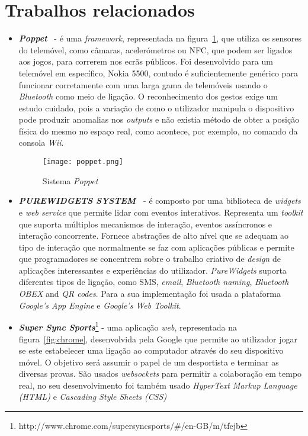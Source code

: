 \section{Trabalhos relacionados}
\begin{itemize}
\item \textbf{\textit{Poppet}}~\cite{Vajk2008b} - é uma \textit{framework}, representada na figura~\ref{fig:poppet}, que utiliza os sensores do telemóvel, como câmaras, acelerómetros ou NFC, que podem ser ligados aos jogos, para correrem nos ecrãs públicos. Foi desenvolvido para um telemóvel em específico, Nokia 5500, contudo é suficientemente genérico para funcionar corretamente com uma larga gama de telemóveis usando o \textit{Bluetooth} como meio de ligação. O reconhecimento dos gestos exige um estudo cuidado, pois a variação de como o utilizador manipula o dispositivo pode produzir anomalias nos \textit{outputs} e não existia método de obter a posição física do mesmo no espaço real, como acontece, por exemplo, no comando da consola \textit{Wii}.

\begin{figure}[ht]
\centering
\texttt{[image: poppet.png]}
\caption[Sistema \textit{Poppet}] {Sistema \textit{Poppet}~\cite{Vajk2008b}}
\label{fig:poppet}
\end{figure}

\item \textbf{\textit{PUREWIDGETS SYSTEM~\cite{Cardoso2012g}}} - é composto por uma biblioteca de \textit{widgets} e \textit{web service} que permite lidar com eventos interativos. Representa um \textit{toolkit} que suporta múltiplos mecanismos de interação, eventos assíncronos e interação concorrente. Fornece abstrações de alto nível que se adequam ao tipo de interação que normalmente se faz com aplicações públicas e permite que programadores se concentrem sobre o trabalho criativo de \textit{design} de aplicações interessantes e experiências do utilizador. \textit{PureWidgets} suporta diferentes tipos de ligação, como SMS, \textit{email}, \textit{Bluetooth naming}, \textit{Bluetooth OBEX} and \textit{QR codes}. Para a sua implementação foi usada a plataforma \textit{Google’s App Engine} e \textit{Google’s Web Toolkit}.


\item \textbf{\textit{Super Sync Sports}}\footnote{http://www.chrome.com/supersyncsports/\#/en-GB/m/tfejb} -  uma aplicação \textit{web}, representada na figura~\ref{fig:chrome}, desenvolvida pela Google que permite ao utilizador jogar se este estabelecer uma ligação ao computador através do seu dispositivo móvel. O objetivo será assumir o papel de um desportista e terminar as diversas provas. São usados \textit{websockets} para permitir a colaboração em tempo real, no seu desenvolvimento foi também usado \textit{HyperText Markup Language (HTML)} e \textit{Cascading Style Sheets (CSS)}


\end{itemize}
